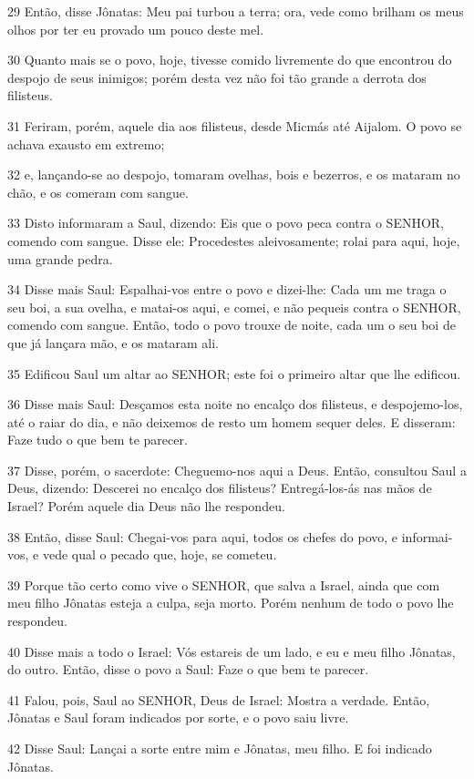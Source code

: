 \par 29 Então, disse Jônatas: Meu pai turbou a terra; ora, vede como brilham os meus olhos por ter eu provado um pouco deste mel.
\par 30 Quanto mais se o povo, hoje, tivesse comido livremente do que encontrou do despojo de seus inimigos; porém desta vez não foi tão grande a derrota dos filisteus.
\par 31 Feriram, porém, aquele dia aos filisteus, desde Micmás até Aijalom. O povo se achava exausto em extremo;
\par 32 e, lançando-se ao despojo, tomaram ovelhas, bois e bezerros, e os mataram no chão, e os comeram com sangue.
\par 33 Disto informaram a Saul, dizendo: Eis que o povo peca contra o SENHOR, comendo com sangue. Disse ele: Procedestes aleivosamente; rolai para aqui, hoje, uma grande pedra.
\par 34 Disse mais Saul: Espalhai-vos entre o povo e dizei-lhe: Cada um me traga o seu boi, a sua ovelha, e matai-os aqui, e comei, e não pequeis contra o SENHOR, comendo com sangue. Então, todo o povo trouxe de noite, cada um o seu boi de que já lançara mão, e os mataram ali.
\par 35 Edificou Saul um altar ao SENHOR; este foi o primeiro altar que lhe edificou.
\par 36 Disse mais Saul: Desçamos esta noite no encalço dos filisteus, e despojemo-los, até o raiar do dia, e não deixemos de resto um homem sequer deles. E disseram: Faze tudo o que bem te parecer.
\par 37 Disse, porém, o sacerdote: Cheguemo-nos aqui a Deus. Então, consultou Saul a Deus, dizendo: Descerei no encalço dos filisteus? Entregá-los-ás nas mãos de Israel? Porém aquele dia Deus não lhe respondeu.
\par 38 Então, disse Saul: Chegai-vos para aqui, todos os chefes do povo, e informai-vos, e vede qual o pecado que, hoje, se cometeu.
\par 39 Porque tão certo como vive o SENHOR, que salva a Israel, ainda que com meu filho Jônatas esteja a culpa, seja morto. Porém nenhum de todo o povo lhe respondeu.
\par 40 Disse mais a todo o Israel: Vós estareis de um lado, e eu e meu filho Jônatas, do outro. Então, disse o povo a Saul: Faze o que bem te parecer.
\par 41 Falou, pois, Saul ao SENHOR, Deus de Israel: Mostra a verdade. Então, Jônatas e Saul foram indicados por sorte, e o povo saiu livre.
\par 42 Disse Saul: Lançai a sorte entre mim e Jônatas, meu filho. E foi indicado Jônatas.
